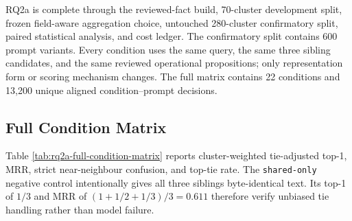 RQ2a is complete through the reviewed-fact build, 70-cluster development split, frozen field-aware aggregation choice, untouched 280-cluster confirmatory split, paired statistical analysis, and cost ledger. The confirmatory split contains 600 prompt variants. Every condition uses the same query, the same three sibling candidates, and the same reviewed operational propositions; only representation form or scoring mechanism changes. The full matrix contains 22 conditions and 13,200 unique aligned condition--prompt decisions.

\subsection{Full Condition Matrix}

Table \ref{tab:rq2a-full-condition-matrix} reports cluster-weighted tie-adjusted top-1, MRR, strict near-neighbour confusion, and top-tie rate. The \texttt{shared-only} negative control intentionally gives all three siblings byte-identical text. Its top-1 of $1/3$ and MRR of $(1+1/2+1/3)/3=0.611$ therefore verify unbiased tie handling rather than model failure.

